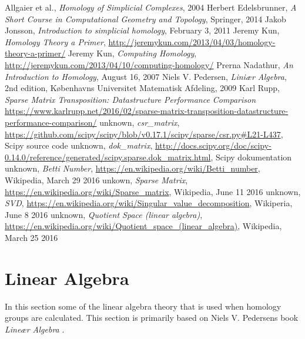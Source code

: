 \documentclass[11pt,a4paper,twoside]{report}
\begin{document}
\begin{thebibliography}{9}

 Allgaier et al., \emph{Homology of Simplicial Complexes}, 2004
Herbert Edelsbrunner, \emph{A Short Course in Computational Geometry and Topology}, Springer, 2014
 Jakob Jonsson, \emph{Introduction to simplicial homology}, February 3, 2011
 Jeremy Kun, \emph{Homology Theory a Primer}, \url{http://jeremykun.com/2013/04/03/homology-theory-a-primer/}
 Jeremy Kun, \emph{Computing Homology}, \url{http://jeremykun.com/2013/04/10/computing-homology/}
 Prerna Nadathur, \emph{An Introduction to Homology}, August 16, 2007
 Niels V. Pedersen, \emph{Liniær Algebra}, 2nd edition, Københavns Universitet Matematisk Afdeling, 2009
 Karl Rupp, \emph{Sparse Matrix Transposition: Datastructure Performance Comparison} \url{https://www.karlrupp.net/2016/02/sparse-matrix-transposition-datastructure-performance-comparison/}
 unknown, \emph{csr\_matrix}, \url{https://github.com/scipy/scipy/blob/v0.17.1/scipy/sparse/csr.py#L21-L437}, Scipy source code
 unknown, \emph{dok\_matrix}, \url{http://docs.scipy.org/doc/scipy-0.14.0/reference/generated/scipy.sparse.dok_matrix.html}, Scipy dokumentation
 unknown, \emph{Betti Number}, \url{https://en.wikipedia.org/wiki/Betti_number}, Wikipedia, March 29 2016
 unkown, \emph{Sparse Matrix}, \url{https://en.wikipedia.org/wiki/Sparse_matrix}, Wikipedia, June 11 2016
 unknown, \emph{SVD}, \url{https://en.wikipedia.org/wiki/Singular_value_decomposition}, Wikiperia, June 8 2016
 unknown, \emph{Quotient Space (linear algebra)}, \url{https://en.wikipedia.org/wiki/Quotient_space_(linear_algebra)}, Wikipedia, March 25 2016
\end{thebibliography}

\appendix
\chapter{Linear Algebra}\label{ch:linalg}
In this section some of the linear algebra theory that is used when homology groups are calculated. This section is primarily based on Niels V. Pedersens book \emph{Lineær Algebra} \cite{LinAlg}.
\end{document}

